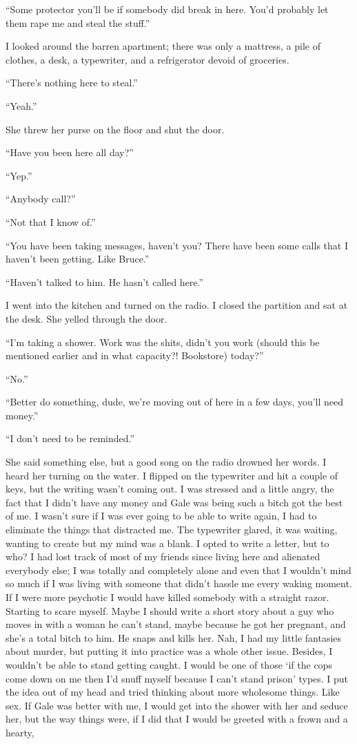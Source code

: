 ``Some protector you'll be if somebody did break in here. You'd probably
let them rape me and steal the stuff.''

I looked around the barren apartment; there was only a mattress, a pile
of clothes, a desk, a typewriter, and a refrigerator devoid of
groceries.

``There's nothing here to steal.''

``Yeah.''

She threw her purse on the floor and shut the door.

``Have you been here all day?''

``Yep.''

``Anybody call?''

``Not that I know of.''

``You have been taking messages, haven't you? There have been some calls
that I haven't been getting. Like Bruce.''

``Haven't talked to him. He hasn't called here.''

I went into the kitchen and turned on the radio. I closed the partition
and sat at the desk. She yelled through the door.

``I'm taking a shower. Work was the shits, didn't you work (should this
be mentioned earlier and in what capacity?! Bookstore) today?''

``No.''

``Better do something, dude, we're moving out of here in a few days,
you'll need money.''

``I don't need to be reminded.''

She said something else, but a good song on the radio drowned her words.
I heard her turning on the water. I flipped on the typewriter and hit a
couple of keys, but the writing wasn't coming out. I was stressed and a
little angry, the fact that I didn't have any money and Gale was being
such a bitch got the best of me. I wasn't sure if I was ever going to be
able to write again, I had to eliminate the things that distracted me.
The typewriter glared, it was waiting, wanting to create but my mind was
a blank. I opted to write a letter, but to who? I had lost track of most
of my friends since living here and alienated everybody else; I was
totally and completely alone and even that I wouldn't mind so much if I
was living with someone that didn't hassle me every waking moment. If I
were more psychotic I would have killed somebody with a straight razor.
Starting to scare myself. Maybe I should write a short story about a guy
who moves in with a woman he can't stand, maybe because he got her
pregnant, and she's a total bitch to him. He snaps and kills her. Nah, I
had my little fantasies about murder, but putting it into practice was a
whole other issue. Besides, I wouldn't be able to stand getting caught.
I would be one of those `if the cops come down on me then I'd snuff
myself because I can't stand prison' types. I put the idea out of my
head and tried thinking about more wholesome things. Like sex. If Gale
was better with me, I would get into the shower with her and seduce her,
but the way things were, if I did that I would be greeted with a frown
and a hearty,

